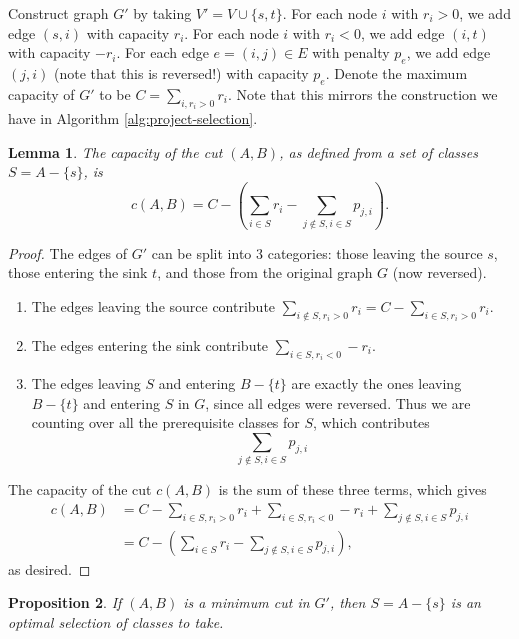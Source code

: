 \documentclass[10pt]{article}
\newtheorem{lemma}{Lemma}
\newtheorem{proposition}[lemma]{Proposition}
\begin{document}
Construct graph \(G'\) by taking \(V' = V \cup \{s, t\}\). For each node \(i\) with \(r_i > 0\), we add edge \((s, i)\) with capacity \(r_i\). For each node \(i\) with \(r_i < 0\), we add edge \((i, t)\) with capacity \(-r_i\). For each edge \(e = (i, j) \in E\) with penalty \(p_e\), we add edge \((j, i)\) (note that this is reversed!) with capacity \(p_e\). Denote the maximum capacity of \(G'\) to be \(C = \sum_{i, r_i > 0} r_i\). Note that this mirrors the construction we have in Algorithm \ref{alg:project-selection}.

\begin{lemma}
  The capacity of the cut \((A, B)\), as defined from a set of classes \(S = A - \{s\}\), is 
  \[c(A, B) = C - \left(\sum_{i \in S} r_i - \sum_{j \notin S, i \in S} p_{j, i}\right).\]
\end{lemma}

\begin{proof}
  The edges of \(G'\) can be split into 3 categories: those leaving the source \(s\), those entering the sink \(t\), and those from the original graph \(G\) (now reversed).
  \begin{enumerate}
    \item The edges leaving the source contribute \(\sum_{i \notin S, r_i > 0} r_i = C - \sum_{i \in S, r_i > 0} r_i\).
    \item The edges entering the sink contribute \(\sum_{i \in S, r_i < 0} -r_i\).
    \item The edges leaving \(S\) and entering \(B - \{t\}\) are exactly the ones leaving \(B - \{t\}\) and entering \(S\) in \(G\), since all edges were reversed. Thus we are counting over all the prerequisite classes for \(S\), which contributes
    \[\sum_{j \notin S, i \in S} p_{j, i}\]
  \end{enumerate}
  The capacity of the cut \(c(A, B)\) is the sum of these three terms, which gives
  \begin{align*}
    c(A, B) &= C - \sum_{i \in S, r_i > 0} r_i + \sum_{i \in S, r_i < 0} -r_i + \sum_{j \notin S, i \in S} p_{j, i} \\
    &= C - \left(\sum_{i \in S} r_i - \sum_{j \notin S, i \in S} p_{j, i}\right),
  \end{align*}
  as desired.
\end{proof}

\begin{proposition}
  If \((A, B)\) is a minimum cut in \(G'\), then \(S = A - \{s\}\) is an optimal selection of classes to take.
\end{proposition}
\end{document}
